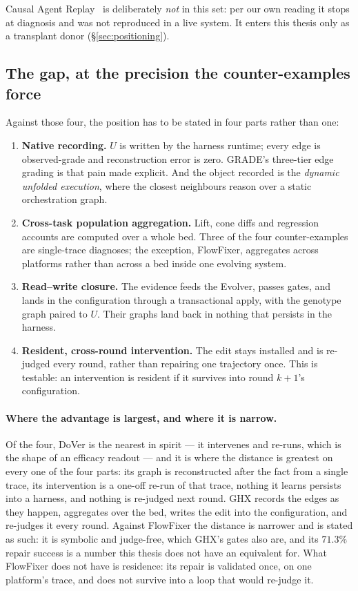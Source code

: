 Causal Agent Replay~\cite{car} is deliberately \emph{not} in this set: per
our own reading it stops at diagnosis and was not reproduced in a live
system. It enters this thesis only as a transplant donor
(\S\ref{sec:positioning}).

\subsection*{The gap, at the precision the counter-examples force}

Against those four, the position has to be stated in four parts rather than
one:

\begin{enumerate}
  \item \textbf{Native recording.} $U$ is written by the harness runtime;
        every edge is observed-grade and reconstruction error is zero.
        GRADE's three-tier edge grading is that pain made explicit. And the
        object recorded is the \emph{dynamic unfolded execution}, where the
        closest neighbours reason over a static orchestration graph.
  \item \textbf{Cross-task population aggregation.} Lift, cone diffs and
        regression accounts are computed over a whole bed. Three of the
        four counter-examples are single-trace diagnoses; the exception,
        FlowFixer, aggregates across platforms rather than across a bed
        inside one evolving system.
  \item \textbf{Read--write closure.} The evidence feeds the Evolver,
        passes gates, and lands in the configuration through a
        transactional apply, with the genotype graph paired to $U$. Their
        graphs land back in nothing that persists in the harness.
  \item \textbf{Resident, cross-round intervention.} The edit stays
        installed and is re-judged every round, rather than repairing one
        trajectory once. This is testable: an intervention is resident if
        it survives into round $k{+}1$'s configuration.
\end{enumerate}

\paragraph{Where the advantage is largest, and where it is narrow.} Of the
four, DoVer is the nearest in spirit --- it intervenes and re-runs, which
is the shape of an efficacy readout --- and it is where the distance is
greatest on every one of the four parts: its graph is reconstructed after
the fact from a single trace, its intervention is a one-off re-run of that
trace, nothing it learns persists into a harness, and nothing is
re-judged next round. GHX records the edges as they happen, aggregates
over the bed, writes the edit into the configuration, and re-judges it
every round. Against FlowFixer the distance is narrower and is stated as
such: it is symbolic and judge-free, which GHX's gates also are, and its
$71.3\%$ repair success is a number this thesis does not have an
equivalent for. What FlowFixer does not have is residence: its repair is
validated once, on one platform's trace, and does not survive into a
loop that would re-judge it.

